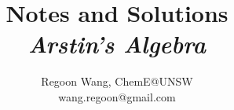 \documentclass[12pt]{report}
\begin{document}
 
\title{\textbf{Notes and Solutions} \\ \large \textit{Arstin's Algebra}}
\author{Regoon Wang, ChemE@UNSW \\ wang.regoon@gmail.com} 
 
\maketitle

\tableofcontents

 
 
 
 
 
 
 

 
 
 

 

\end{document}
